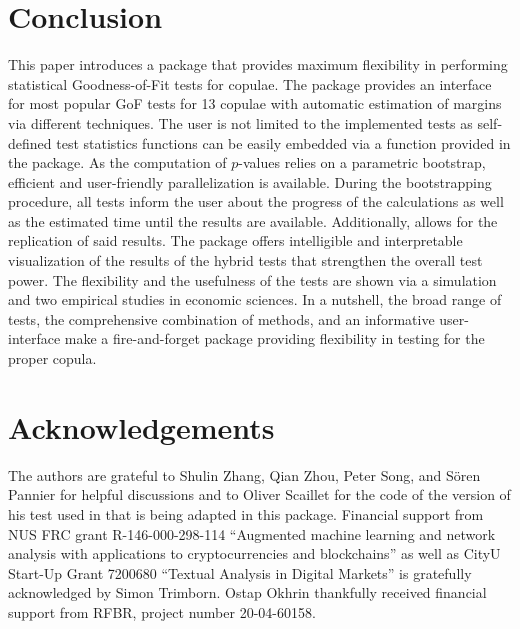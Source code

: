 \section{Conclusion}
\label{sec:conclusion}
This paper introduces a  package that provides maximum flexibility in performing statistical Goodness-of-Fit tests for copulae. The package provides an interface for  most popular GoF tests for 13 copulae with automatic estimation of margins via different techniques. \bk The user is not limited to the implemented tests as self-defined test statistics functions can be easily embedded via a function provided in the package. As the computation of $p$-values relies on a parametric bootstrap, efficient and user-friendly parallelization is available. During the bootstrapping procedure, all tests inform the user about the progress of the calculations as well as the estimated time until the results are available. Additionally,  allows for the replication of said results. The package offers intelligible and interpretable visualization of the results of the hybrid tests that strengthen the overall test power. The flexibility and the usefulness of the tests are shown via a simulation and two empirical studies in economic sciences. In a nutshell, the broad range of tests, the comprehensive combination of methods, and an informative user-interface make  a fire-and-forget package providing flexibility in testing for the proper copula.\\

\section{Acknowledgements}
The authors are grateful to Shulin Zhang, Qian Zhou, Peter Song, and \mycolor Sören Pannier \bk for helpful discussions and to Oliver Scaillet for the code of the version of his test used in \citet{zhang_okhrin_song_zhou_2016} that is being adapted in this package. Financial support from NUS FRC grant R-146-000-298-114 ``Augmented machine learning and network analysis with applications to cryptocurrencies and blockchains'' \mycolor as well as CityU Start-Up Grant 7200680 ``Textual Analysis in Digital Markets'' \bk is gratefully acknowledged by Simon Trimborn. Ostap Okhrin thankfully received financial support from RFBR, project number 20-04-60158.



